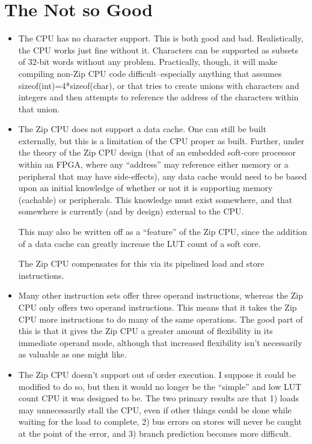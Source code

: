 \documentclass{gqtekspec}
\begin{document}
\section{The Not so Good}
\begin{itemize}
\item The CPU has no character support. This is both good and bad.
	Realistically, the CPU works just fine without it. Characters can be
	supported as subsets of 32-bit words without any problem. Practically,
	though, it will make compiling non-Zip CPU code difficult--especially
	anything that assumes sizeof(int)=4*sizeof(char), or that tries to
	create unions with characters and integers and then attempts to
	reference the address of the characters within that union.

\item The Zip CPU does not support a data cache. One can still be built
	externally, but this is a limitation of the CPU proper as built.
	Further, under the theory of the Zip CPU design (that of an embedded
	soft-core processor within an FPGA, where any ``address'' may reference
	either memory or a peripheral that may have side-effects), any data
	cache would need to be based upon an initial knowledge of whether or
	not it is supporting memory (cachable) or peripherals. This knowledge
	must exist somewhere, and that somewhere is currently (and by design)
	external to the CPU.

	This may also be written off as a ``feature'' of the Zip CPU, since
	the addition of a data cache can greatly increase the LUT count of
	a soft core.

	The Zip CPU compensates for this via its pipelined load and store
	instructions.

\item Many other instruction sets offer three operand instructions, whereas
	the Zip CPU only offers two operand instructions. This means that it
	takes the Zip CPU more instructions to do many of the same operations.
	The good part of this is that it gives the Zip CPU a greater amount of
	flexibility in its immediate operand mode, although that increased
	flexibility isn't necessarily as valuable as one might like.

\item The Zip CPU doesn't support out of order execution. I suppose it could
	be modified to do so, but then it would no longer be the ``simple''
	and low LUT count CPU it was designed to be. The two primary results
	are that 1) loads may unnecessarily stall the CPU, even if other
	things could be done while waiting for the load to complete, 2)
	bus errors on stores will never be caught at the point of the error,
	and 3) branch prediction becomes more difficult.


\end{itemize}
\end{document}
